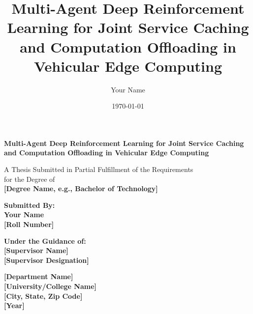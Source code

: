 \documentclass[12pt,a4paper]{report}
\title{\textbf{Multi-Agent Deep Reinforcement Learning for Joint Service Caching and Computation Offloading in Vehicular Edge Computing}}
\author{Your Name}
\date{\today}
\begin{document}
\begin{titlepage}
    \begin{center}
        \vspace*{1cm}
        
        \Large
        \textbf{Multi-Agent Deep Reinforcement Learning for Joint Service Caching and Computation Offloading in Vehicular Edge Computing}
        
        \vspace{1.5cm}
        
        \normalsize
        A Thesis Submitted in Partial Fulfillment of the Requirements \\
        for the Degree of \\
        \textbf{[Degree Name, e.g., Bachelor of Technology]}
        
        \vspace{1.5cm}
        
        \textbf{Submitted By:} \\
        \textbf{Your Name} \\
        \textbf{[Roll Number]}
        
        \vspace{1.5cm}
        
        \textbf{Under the Guidance of:} \\
        \textbf{[Supervisor Name]} \\
        \textbf{[Supervisor Designation]}
        
        \vfill
        
        \vspace{0.8cm}
        
        \Large
        \textbf{[Department Name]} \\
        \textbf{[University/College Name]} \\
        \textbf{[City, State, Zip Code]} \\
        \textbf{[Year]}
        
    \end{center}
\end{titlepage}

\newpage

\tableofcontents
\newpage

\listoffigures
{}
\newpage

\listoftables
{}
\newpage
\end{document}
